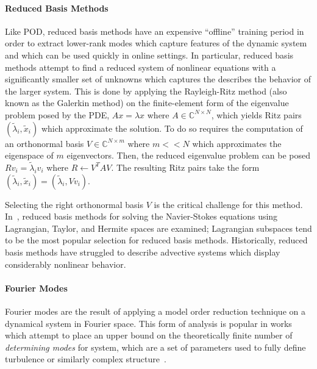 \paragraph{Reduced Basis Methods} Like POD, reduced basis methods have an expensive ``offline'' training period in order to extract lower-rank modes which capture features of the dynamic system and which can be used quickly in online settings\autocite{ohlberger2015reduced}. In particular, reduced basis methods attempt to find a reduced system of nonlinear equations with a significantly smaller set of unknowns which captures the describes the behavior of the larger system. This is done by applying the Rayleigh-Ritz method (also known as the Galerkin method) on the finite-element form of the eigenvalue problem posed by the PDE, $Ax = \lambda x$ where $A\in\mathbb{C}^{N\times N}$, which yields Ritz pairs $(\tilde{\lambda}_i, \tilde{x}_i)$ which approximate the solution\autocite{noor1980reduced}. To do so requires the computation of an orthonormal basis $V \in \mathbb{C}^{N\times m}$ where $m << N$ which approximates the eigenspace of $m$ eigenvectors.
Then, the reduced eigenvalue problem can be posed $Rv_i = \tilde{\lambda}_iv_i$ where $R \longleftarrow V^TAV$. The resulting Ritz pairs take the form $(\tilde{\lambda}_i, \tilde{x}_i) = (\tilde{\lambda}_i, Vv_i)$.

Selecting the right orthonormal basis $V$ is the critical challenge for this method. In~\cite{quarteroni2007numerical}, reduced basis methods for solving the Navier-Stokes equations using Lagrangian, Taylor, and Hermite spaces are examined; Lagrangian subspaces tend to be the most popular selection for reduced basis methods. Historically, reduced basis methods have struggled to describe advective systems which display considerably nonlinear behavior\autocite{quarteroni2007numerical,ohlberger2015reduced}.

\paragraph{Fourier Modes} Fourier modes are the result of applying a model order reduction technique on a dynamical system in Fourier space. This form of analysis is popular in works which attempt to place an upper bound on the theoretically finite number of \emph{determining modes} for system, which are a set of parameters used to fully define turbulence or similarly complex structure~\cite{jones1993upper}.

